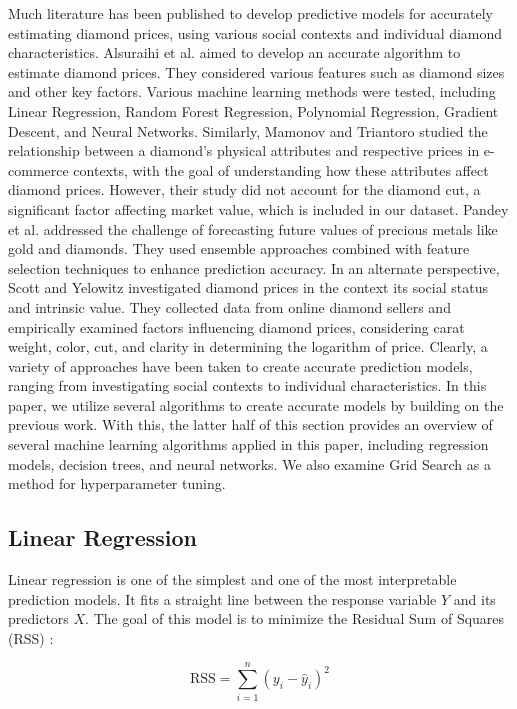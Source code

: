 \documentclass[conference]{IEEEtran}
\begin{document}
Much literature has been published to develop predictive models for accurately estimating diamond prices, using various social contexts and individual diamond characteristics. Alsuraihi et al. \cite{Alsuraihi} aimed to develop an accurate algorithm to estimate diamond prices. They considered various features such as diamond sizes and other key factors. Various machine learning methods were tested, including Linear Regression, Random Forest Regression, Polynomial Regression, Gradient Descent, and Neural Networks. Similarly, Mamonov and Triantoro \cite{Mamonov} studied the relationship between a diamond's physical attributes and respective prices in e-commerce contexts, with the goal of understanding how these attributes affect diamond prices. However, their study did not account for the diamond cut, a significant factor affecting market value, which is included in our dataset. Pandey et al. \cite{Pandey} addressed the challenge of forecasting future values of precious metals like gold and diamonds. They used ensemble approaches combined with feature selection techniques to enhance prediction accuracy. In an alternate perspective, Scott and Yelowitz \cite{Scott} investigated diamond prices in the context its social status and intrinsic value. They collected data from online diamond sellers and empirically examined factors influencing diamond prices, considering carat weight, color, cut, and clarity in determining the logarithm of price. Clearly, a variety of approaches have been taken to create accurate prediction models, ranging from investigating social contexts to individual characteristics. In this paper, we utilize several algorithms to create accurate models by building on the previous work. With this, the latter half of this section provides an overview of several machine learning algorithms applied in this paper, including regression models, decision trees, and neural networks. We also examine Grid Search as a method for hyperparameter tuning.

\subsection{Linear Regression}

Linear regression is one of the simplest and one of the most interpretable prediction models. It fits a straight line between the response variable $Y$ and its predictors $X$. The goal of this model is to minimize the Residual Sum of Squares (RSS) \cite{Seber}:

\[
\text{RSS} = \sum_{i=1}^n (y_i - \hat{y}_i)^2
\]
\end{document}
